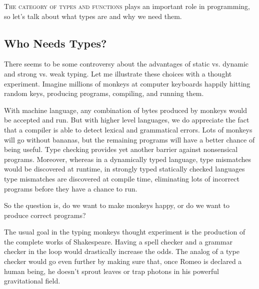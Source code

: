\lettrine[lhang=0.17]{T}{he category of types and functions} plays an important role in
programming, so let's talk about what types are and why we need them.

\subsection{Who Needs Types?}\label{who-needs-types}

There seems to be some controversy about the advantages of static vs.
dynamic and strong vs. weak typing. Let me illustrate these choices with
a thought experiment. Imagine millions of monkeys at computer keyboards
happily hitting random keys, producing programs, compiling, and running
them.

\begin{figure}
  \centering
\end{figure}

With machine language, any combination of bytes produced by monkeys
would be accepted and run. But with higher level languages, we do
appreciate the fact that a compiler is able to detect lexical and
grammatical errors. Lots of monkeys will go without bananas, but the
remaining programs will have a better chance of being useful. Type
checking provides yet another barrier against nonsensical programs.
Moreover, whereas in a dynamically typed language, type mismatches would
be discovered at runtime, in strongly typed statically checked languages
type mismatches are discovered at compile time, eliminating lots of
incorrect programs before they have a chance to run.

So the question is, do we want to make monkeys happy, or do we want to
produce correct programs?

The usual goal in the typing monkeys thought experiment is the
production of the complete works of Shakespeare. Having a spell checker
and a grammar checker in the loop would drastically increase the odds.
The analog of a type checker would go even further by making sure that,
once Romeo is declared a human being, he doesn't sprout leaves or trap
photons in his powerful gravitational field.

